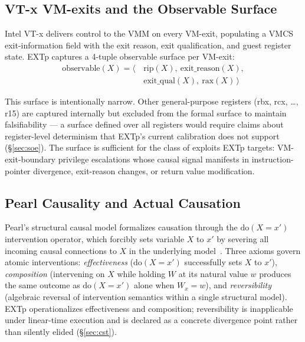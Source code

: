 \documentclass[conference]{IEEEtran}
\newcommand{\dox}[1]{\text{do}(X{=}#1)}
\begin{document}
\subsection{VT-x VM-exits and the Observable Surface}

Intel VT-x delivers control to the VMM on every VM-exit, populating
a VMCS exit-information field with the exit reason, exit
qualification, and guest register state. EXTp captures a 4-tuple
observable surface per VM-exit:
\begin{equation}
\begin{aligned}
\text{observable}(X) = \langle\,&\text{rip}(X),\ \text{exit\_reason}(X), \\
                                &\text{exit\_qual}(X),\ \text{rax}(X)\,\rangle
\end{aligned}
\end{equation}

This surface is intentionally narrow. Other general-purpose registers
(rbx, rcx, \ldots, r15) are captured internally but excluded from the
formal surface to maintain falsifiability --- a surface defined over
all registers would require claims about register-level determinism
that EXTp's current calibration does not support (\S\ref{sec:soe}).
The surface is sufficient for the class of exploits EXTp targets:
VM-exit-boundary privilege escalations whose causal signal manifests
in instruction-pointer divergence, exit-reason changes, or return
value modification.

\subsection{Pearl Causality and Actual Causation}

Pearl's structural causal model formalizes causation through the
$\dox{x'}$ intervention operator, which forcibly sets variable $X$
to $x'$ by severing all incoming causal connections to $X$ in the
underlying model~\cite{pearl2009causality}. Three axioms govern
atomic interventions: \emph{effectiveness} ($\dox{x'}$ successfully
sets $X$ to $x'$), \emph{composition} (intervening on $X$ while
holding $W$ at its natural value $w$ produces the same outcome as
$\dox{x'}$ alone when $W_x = w$), and \emph{reversibility}
(algebraic reversal of intervention semantics within a single
structural model). EXTp operationalizes effectiveness and
composition; reversibility is inapplicable under linear-time
execution and is declared as a concrete divergence point rather than
silently elided (\S\ref{sec:cst}).
\end{document}
